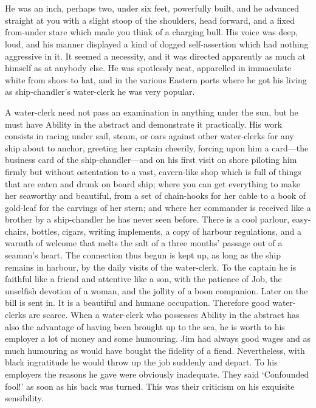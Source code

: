 \vspace*{\onelineskip}
\chapter{}
He was an inch, perhaps two, under six feet, powerfully built, and he advanced straight at you with a slight stoop of the shoulders, head forward, and a fixed from-under stare which made you think of a charging bull. His voice was deep, loud, and his manner displayed a kind of dogged self-assertion which had nothing aggressive in it. It seemed a necessity, and it was directed apparently as much at himself as at anybody else. He was spotlessly neat, apparelled in immaculate white from shoes to hat, and in the various Eastern ports where he got his living as ship-chandler’s water-clerk he was very popular.

A water-clerk need not pass an examination in anything under the sun, but he must have Ability in the abstract and demonstrate it practically. His work consists in racing under sail, steam, or oars against other water-clerks for any ship about to anchor, greeting her captain cheerily, forcing upon him a card—the business card of the ship-chandler—and on his first visit on shore piloting him firmly but without ostentation to a vast, cavern-like shop which is full of things that are eaten and drunk on board ship; where you can get everything to make her seaworthy and beautiful, from a set of chain-hooks for her cable to a book of gold-leaf for the carvings of her stern; and where her commander is received like a brother by a ship-chandler he has never seen before. There is a cool parlour, easy-chairs, bottles, cigars, writing implements, a copy of harbour regulations, and a warmth of welcome that melts the salt of a three months’ passage out of a seaman’s heart. The connection thus begun is kept up, as long as the ship remains in harbour, by the daily visits of the water-clerk. To the captain he is faithful like a friend and attentive like a son, with the patience of Job, the unselfish devotion of a woman, and the jollity of a boon companion. Later on the bill is sent in. It is a beautiful and humane occupation. Therefore good water-clerks are scarce. When a water-clerk who possesses Ability in the abstract has also the advantage of having been brought up to the sea, he is worth to his employer a lot of money and some humouring. Jim had always good wages and as much humouring as would have bought the fidelity of a fiend. Nevertheless, with black ingratitude he would throw up the job suddenly and depart. To his employers the reasons he gave were obviously inadequate. They said ‘Confounded fool!’ as soon as his back was turned. This was their criticism on his exquisite sensibility.

